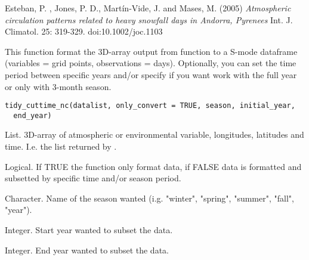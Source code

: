 \documentclass[a4paper]{book}
\begin{document}
%
\begin{References}\relax

Esteban, P. , Jones, P. D., Martín‐Vide, J. and Mases, M. (2005)
\emph{Atmospheric circulation patterns related to heavy snowfall days in Andorra, Pyrenees}
Int. J. Climatol. 25: 319-329. doi:10.1002/joc.1103

\end{References}
%
\begin{SeeAlso}\relax
{}
\end{SeeAlso}
%
\begin{Examples}
\end{Examples}
%
\begin{Description}\relax
This function format the 3D-array output from  function to a S-mode dataframe (variables = grid points, observations = days). Optionally, you can set the time period between specific years and/or specify if you want work with the full year or only with 3-month season.
\end{Description}
%
\begin{Usage}
\begin{verbatim}
tidy_cuttime_nc(datalist, only_convert = TRUE, season, initial_year,
  end_year)
\end{verbatim}
\end{Usage}
%
\begin{Arguments}
\begin{ldescription}
\item[\code{datalist}] List. 3D-array of atmospheric or environmental variable, longitudes, latitudes and time. I.e. the list returned by .

\item[\code{only\_convert}] Logical. If TRUE the function only format data, if FALSE data is formatted and subsetted by specific time and/or season period.

\item[\code{season}] Character. Name of the season wanted (i.g. "winter", "spring", "summer", "fall", "year").

\item[\code{initial\_year}] Integer. Start year wanted to subset the data.

\item[\code{end\_year}] Integer. End year wanted to subset the data.
\end{ldescription}
\end{Arguments}
\end{document}
